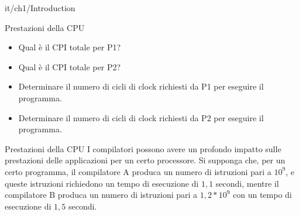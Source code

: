 \documentclass[11pt]{article}
\begin{document}
\begin{quiz}{it/ch1/Introduction}
\begin{cloze}[points=1,shuffle=true]{Prestazioni della CPU}
\begin{itemize}
    \item Qual è il CPI totale per P1? 
    \item Qual è il CPI totale per P2? 
    \item Determinare il numero di cicli di clock richiesti da P1 per eseguire il programma.
    \item Determinare il numero di cicli di clock richiesti da P2 per eseguire il programma.
\end{itemize}
\end{cloze}

\begin{cloze}[points=1,shuffle=false]{Prestazioni della CPU}
I compilatori possono avere un profondo impatto sulle prestazioni delle applicazioni per un certo processore. Si supponga che, per un certo programma, il compilatore A produca un numero di istruzioni pari a $10^9$, e queste istruzioni richiedono un tempo di esecuzione di $1,1$ secondi, mentre il compilatore B produca un numero di istruzioni pari a $1,2 * 10^9$ con un tempo di esecuzione di $1,5$ secondi.


\end{cloze}
\end{quiz}
\end{document}
